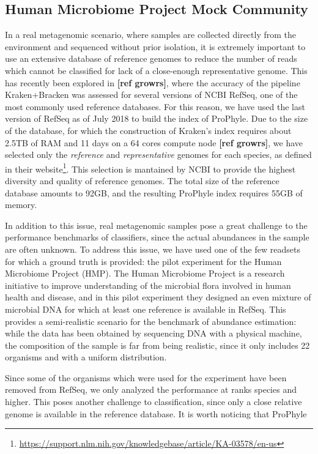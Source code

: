\subsection{Human Microbiome Project Mock Community}

In a real metagenomic scenario, where samples are collected directly from the environment and sequenced without prior isolation, it is extremely important to use an extensive database of reference genomes to reduce the number of reads which cannot be classified for lack of a close-enough representative genome. This has recently been explored in \textbf{[ref growrs]}, where the accuracy of the pipeline Kraken+Bracken was assessed for several versions of NCBI RefSeq, one of the most commonly used reference databases. For this reason, we have used the last version of RefSeq as of July 2018 to build the index of ProPhyle. Due to the size of the database, for which the construction of Kraken's index requires about 2.5TB of RAM and 11 days on a 64 cores compute node \textbf{[ref growrs]}, we have selected only the \textit{reference} and \textit{representative} genomes for each species, as defined in their website\footnote{\url{https://support.nlm.nih.gov/knowledgebase/article/KA-03578/en-us}}. This selection is mantained by NCBI to provide the highest diversity and quality of reference genomes. The total size of the reference database amounts to 92GB, and the resulting ProPhyle index requires 55GB of memory.

In addition to this issue, real metagenomic samples pose a great challenge to the performance benchmarks of classifiers, since the actual abundances in the sample are often unknown. To address this issue, we have used one of the few readsets for which a ground truth is provided: the pilot experiment for the Human Microbiome Project (HMP). The Human Microbiome Project is a research initiative to improve understanding of the microbial flora involved in human health and disease, and in this pilot experiment they designed an even mixture of microbial DNA for which at least one reference is available in RefSeq. This provides a semi-realistic scenario for the benchmark of abundance estimation: while the data has been obtained by sequencing DNA with a physical machine, the composition of the sample is far from being realistic, since it only includes 22 organisms and with a uniform distribution.

Since some of the organisms which were used for the experiment have been removed from RefSeq, we only analyzed the performance at ranks species and higher. This poses another challenge to classification, since only a close relative genome is available in the reference database. It is worth noticing that ProPhyle 


